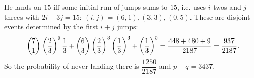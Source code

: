 He lands on $15$ iff some initial run of jumps sums to $15$, i.e. uses $i$ twos and $j$ threes with $2i+3j=15$: $(i,j)=(6,1),(3,3),(0,5)$. These are disjoint events determined by the first $i+j$ jumps:
\[\dbinom71\left(\dfrac23\right)^6\dfrac13+\dbinom63\left(\dfrac23\right)^3\left(\dfrac13\right)^3+\left(\dfrac13\right)^5=\dfrac{448+480+9}{2187}=\dfrac{937}{2187}.\]
So the probability of never landing there is $\dfrac{1250}{2187}$ and $p+q=\boxed{3437}$.
